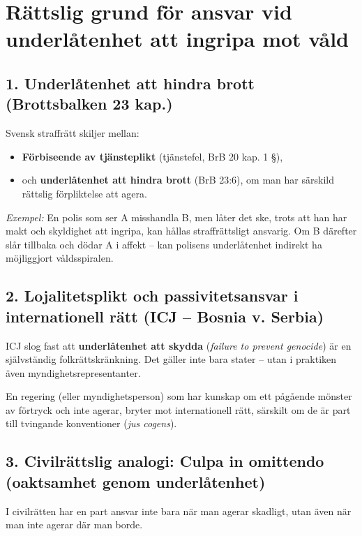 \section*{Rättslig grund för ansvar vid underlåtenhet att ingripa mot våld}

\subsection*{1. Underlåtenhet att hindra brott (Brottsbalken 23 kap.)}

Svensk straffrätt skiljer mellan:

\begin{itemize}
  \item \textbf{Förbiseende av tjänsteplikt} (tjänstefel, BrB 20 kap. 1 §),
  \item och \textbf{underlåtenhet att hindra brott} (BrB 23:6), om man har särskild rättslig förpliktelse att agera.
\end{itemize}

\textit{Exempel:} En polis som ser A misshandla B, men låter det ske, trots att han har makt och skyldighet att ingripa, kan hållas straffrättsligt ansvarig.  
Om B därefter slår tillbaka och dödar A i affekt – kan polisens underlåtenhet indirekt ha möjliggjort våldsspiralen.

\subsection*{2. Lojalitetsplikt och passivitetsansvar i internationell rätt (ICJ – Bosnia v. Serbia)}

ICJ slog fast att \textbf{underlåtenhet att skydda} (\textit{failure to prevent genocide}) är en självständig folkrättskränkning.  
Det gäller inte bara stater – utan i praktiken även myndighetsrepresentanter.

En regering (eller myndighetsperson) som har kunskap om ett pågående mönster av förtryck och inte agerar, bryter mot internationell rätt, särskilt om de är part till tvingande konventioner (\textit{jus cogens}).

\subsection*{3. Civilrättslig analogi: Culpa in omittendo (oaktsamhet genom underlåtenhet)}

I civilrätten har en part ansvar inte bara när man agerar skadligt, utan även när man inte agerar där man borde.


